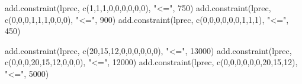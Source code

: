 \documentclass[
]{article}
\newenvironment{Shaded}{\begin{snugshade}}{\end{snugshade}}
\newcommand{\DecValTok}[1]{\textcolor[rgb]{0.00,0.00,0.81}{#1}}
\newcommand{\FunctionTok}[1]{\textcolor[rgb]{0.00,0.00,0.00}{#1}}
\newcommand{\NormalTok}[1]{#1}
\newcommand{\StringTok}[1]{\textcolor[rgb]{0.31,0.60,0.02}{#1}}
\begin{document}
\begin{Shaded}
\begin{Highlighting}[]
\FunctionTok{add.constraint}\NormalTok{(lprec, }\FunctionTok{c}\NormalTok{(}\DecValTok{1}\NormalTok{,}\DecValTok{1}\NormalTok{,}\DecValTok{1}\NormalTok{,}\DecValTok{0}\NormalTok{,}\DecValTok{0}\NormalTok{,}\DecValTok{0}\NormalTok{,}\DecValTok{0}\NormalTok{,}\DecValTok{0}\NormalTok{,}\DecValTok{0}\NormalTok{), }\StringTok{"\textless{}="}\NormalTok{, }\DecValTok{750}\NormalTok{)}
\FunctionTok{add.constraint}\NormalTok{(lprec, }\FunctionTok{c}\NormalTok{(}\DecValTok{0}\NormalTok{,}\DecValTok{0}\NormalTok{,}\DecValTok{0}\NormalTok{,}\DecValTok{1}\NormalTok{,}\DecValTok{1}\NormalTok{,}\DecValTok{1}\NormalTok{,}\DecValTok{0}\NormalTok{,}\DecValTok{0}\NormalTok{,}\DecValTok{0}\NormalTok{), }\StringTok{"\textless{}="}\NormalTok{, }\DecValTok{900}\NormalTok{)}
\FunctionTok{add.constraint}\NormalTok{(lprec, }\FunctionTok{c}\NormalTok{(}\DecValTok{0}\NormalTok{,}\DecValTok{0}\NormalTok{,}\DecValTok{0}\NormalTok{,}\DecValTok{0}\NormalTok{,}\DecValTok{0}\NormalTok{,}\DecValTok{0}\NormalTok{,}\DecValTok{1}\NormalTok{,}\DecValTok{1}\NormalTok{,}\DecValTok{1}\NormalTok{), }\StringTok{"\textless{}="}\NormalTok{, }\DecValTok{450}\NormalTok{)}
\end{Highlighting}
\end{Shaded}

\begin{Shaded}
\begin{Highlighting}[]
\FunctionTok{add.constraint}\NormalTok{(lprec, }\FunctionTok{c}\NormalTok{(}\DecValTok{20}\NormalTok{,}\DecValTok{15}\NormalTok{,}\DecValTok{12}\NormalTok{,}\DecValTok{0}\NormalTok{,}\DecValTok{0}\NormalTok{,}\DecValTok{0}\NormalTok{,}\DecValTok{0}\NormalTok{,}\DecValTok{0}\NormalTok{,}\DecValTok{0}\NormalTok{), }\StringTok{"\textless{}="}\NormalTok{, }\DecValTok{13000}\NormalTok{)}
\FunctionTok{add.constraint}\NormalTok{(lprec, }\FunctionTok{c}\NormalTok{(}\DecValTok{0}\NormalTok{,}\DecValTok{0}\NormalTok{,}\DecValTok{0}\NormalTok{,}\DecValTok{20}\NormalTok{,}\DecValTok{15}\NormalTok{,}\DecValTok{12}\NormalTok{,}\DecValTok{0}\NormalTok{,}\DecValTok{0}\NormalTok{,}\DecValTok{0}\NormalTok{), }\StringTok{"\textless{}="}\NormalTok{, }\DecValTok{12000}\NormalTok{)}
\FunctionTok{add.constraint}\NormalTok{(lprec, }\FunctionTok{c}\NormalTok{(}\DecValTok{0}\NormalTok{,}\DecValTok{0}\NormalTok{,}\DecValTok{0}\NormalTok{,}\DecValTok{0}\NormalTok{,}\DecValTok{0}\NormalTok{,}\DecValTok{0}\NormalTok{,}\DecValTok{20}\NormalTok{,}\DecValTok{15}\NormalTok{,}\DecValTok{12}\NormalTok{), }\StringTok{"\textless{}="}\NormalTok{, }\DecValTok{5000}\NormalTok{)}
\end{Highlighting}
\end{Shaded}
\end{document}
